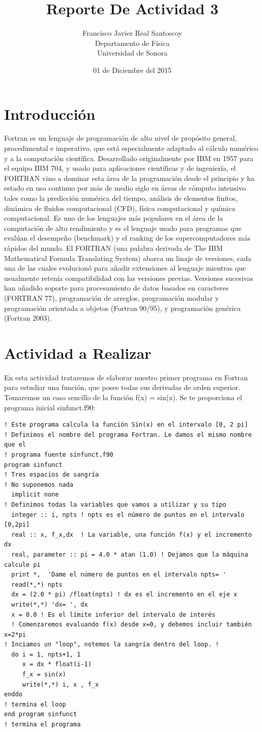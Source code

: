 \documentclass[12pt,a4paper,openright]{article}
\title{Reporte De Actividad 3}
\author{Francisco Javier Real Santoscoy\\
Departamento de Física\\
Universidad de Sonora}
\date {01 de Diciembre del 2015}
\begin{document}
\maketitle
\section{Introducción}
Fortran es un lenguaje de programación de alto nivel de propósito general, procedimental e imperativo, que está especialmente adaptado al cálculo numérico y a la computación científica. Desarrollado originalmente por IBM en 1957 para el equipo IBM 704, y usado para aplicaciones científicas y de ingeniería, el FORTRAN vino a dominar esta área de la programación desde el principio y ha estado en uso continuo por más de medio siglo en áreas de cómputo intensivo tales como la predicción numérica del tiempo, análisis de elementos finitos, dinámica de fluidos computacional (CFD), física computacional y química computacional. Es uno de los lenguajes más populares en el área de la computación de alto rendimiento y es el lenguaje usado para programas que evalúan el desempeño (benchmark) y el ranking de los supercomputadores más rápidos del mundo.
El FORTRAN (una palabra derivada de The IBM Mathematical Formula Translating System) abarca un linaje de versiones, cada una de las cuales evolucionó para añadir extensiones al lenguaje mientras que usualmente retenía compatibilidad con las versiones previas. Versiones sucesivas han añadido soporte para procesamiento de datos basados en caracteres (FORTRAN 77), programación de arreglos, programación modular y programación orientada a objetos (Fortran 90/95), y programación genérica (Fortran 2003).
\section{Actividad a Realizar}
En esta actividad trataremos de elaborar nuestro primer programa en Fortran para estudiar una función, que posee todas sus derivadas de orden superior.
Tomaremos un caso sencillo de la función f(x) = sin(x). Se te proporciona el programa inicial sinfunct.f90:

\begin{verbatim}
! Este programa calcula la función Sin(x) en el intervalo [0, 2 pi]
! Definimos el nombre del programa Fortran. Le damos el mismo nombre que el 
! programa fuente sinfunct.f90 
program sinfunct
! Tres espacios de sangría
! No suponemos nada
  implicit none 
! Definimos todas la variables que vamos a utilizar y su tipo
  integer :: i, npts ! npts es el número de puntos en el intervalo [0,2pi]
  real :: x, f_x,dx  ! La variable, una función f(x) y el incremento dx
  real, parameter :: pi = 4.0 * atan (1.0) ! Dejamos que la máquina calcule pi 
  print *,  'Dame el número de puntos en el intervalo npts= '
  read(*,*) npts 
  dx = (2.0 * pi) /float(npts) ! dx es el incremento en el eje x
  write(*,*) 'dx= ', dx 
  x = 0.0 ! Es el límite inferior del intervalo de interés
  ! Comenzaremos evaluando f(x) desde x=0, y debemos incluir también x=2*pi
! Inciamos un "loop", notemos la sangría dentro del loop. !
  do i = 1, npts+1, 1 
     x = dx * float(i-1)
     f_x = sin(x)
     write(*,*) i, x , f_x
enddo
! termina el loop 
end program sinfunct 
! termina el programa
\end{verbatim}
\end{document}
